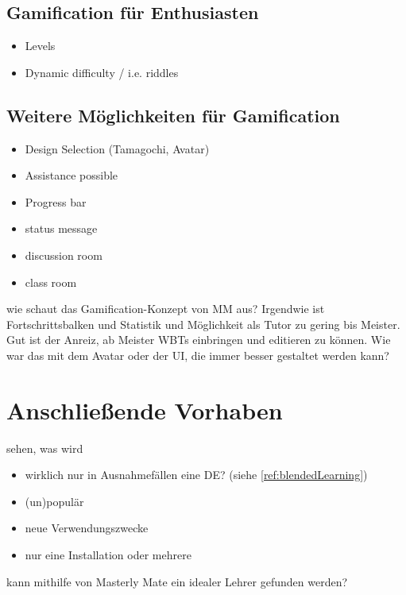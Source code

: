 \begin{k}
 \subsection{Gamification für Enthusiasten}
 \begin{itemize}
    \item Levels
    \item Dynamic difficulty / i.e. riddles
  \end{itemize}
  
 \subsection{Weitere Möglichkeiten für Gamification}
\begin{itemize}
\item Design Selection (Tamagochi, Avatar)
  \item Assistance possible
  \item Progress bar
  \item status message
  \item discussion room
  \item class room
  \end{itemize}
  
wie schaut das Gamification-Konzept von MM aus? Irgendwie ist Fortschrittsbalken
und Statistik und Möglichkeit als Tutor zu gering bis Meister. Gut ist der
Anreiz, ab Meister WBTs einbringen und editieren zu können. Wie war das mit dem
Avatar oder der UI, die immer besser gestaltet werden kann?

\end{k}

\section{Anschließende Vorhaben}
\begin{k}
sehen, was wird
\begin{itemize}
  \item wirklich nur in Ausnahmefällen eine DE? (siehe
  \ref{ref:blendedLearning})
  \item (un)populär
  \item neue Verwendungszwecke
  \item nur eine Installation oder mehrere
\end{itemize}

kann mithilfe von Masterly Mate ein idealer Lehrer gefunden werden?
\end{k}
